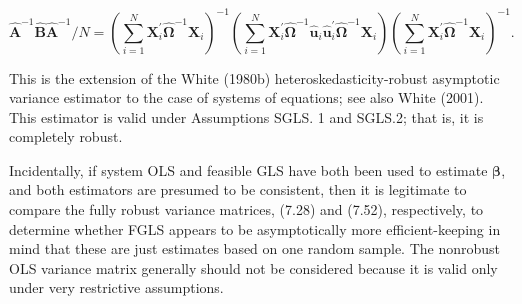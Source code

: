 \documentclass[10pt]{article}
\begin{document}
\begin{equation*}
\hat{\mathbf{A}}^{-1} \hat{\mathbf{B}} \hat{\mathbf{A}}^{-1} / N=\left(\sum_{i=1}^{N} \mathbf{X}_{i}^{\prime} \hat{\boldsymbol{\Omega}}^{-1} \mathbf{X}_{i}\right)^{-1}\left(\sum_{i=1}^{N} \mathbf{X}_{i}^{\prime} \hat{\boldsymbol{\Omega}}^{-1} \hat{\mathbf{u}}_{i} \hat{\mathbf{u}}_{i}^{\prime} \hat{\boldsymbol{\Omega}}^{-1} \mathbf{X}_{i}\right)\left(\sum_{i=1}^{N} \mathbf{X}_{i}^{\prime} \hat{\boldsymbol{\Omega}}^{-1} \mathbf{X}_{i}\right)^{-1} . \tag{7.52}
\end{equation*}


This is the extension of the White (1980b) heteroskedasticity-robust asymptotic variance estimator to the case of systems of equations; see also White (2001). This estimator is valid under Assumptions SGLS. 1 and SGLS.2; that is, it is completely robust.

Incidentally, if system OLS and feasible GLS have both been used to estimate $\boldsymbol{\beta}$, and both estimators are presumed to be consistent, then it is legitimate to compare the fully robust variance matrices, (7.28) and (7.52), respectively, to determine whether FGLS appears to be asymptotically more efficient-keeping in mind that these are just estimates based on one random sample. The nonrobust OLS variance matrix generally should not be considered because it is valid only under very restrictive assumptions.
\end{document}
